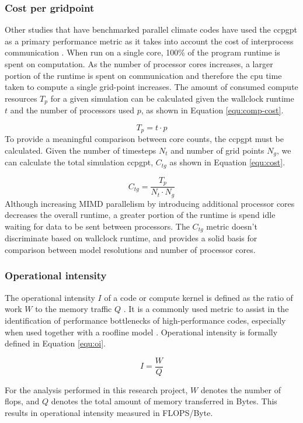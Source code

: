 \documentclass[a4paper,11pt]{report}
\begin{document}
\subsubsection{Cost per gridpoint}
Other studies that have benchmarked parallel climate codes have used the \gls{ccpgpt} as a primary performance metric as it takes into account the cost of interprocess communication \cite{schmidt2007benchmark}. When run on a single core, 100\% of the program runtime is spent on computation. As the number of processor cores increases, a larger portion of the runtime is spent on communication and therefore the cpu time taken to compute a single grid-point increases. The amount of consumed compute resources $T_p$ for a given simulation can be calculated given the wallclock runtime $t$ and the number of processors used $p$, as shown in Equation \ref{equ:comp-cost}.
\par
\begin{equation}
T_p = t \cdot p
\label{equ:comp-cost}
\end{equation}
To provide a meaningful comparison between core counts, the \gls{ccpgpt} must be calculated. Given the number of timesteps $N_t$ and number of grid points $N_g$, we can calculate the total simulation \gls{ccpgpt}, $C_{tg}$ as shown in Equation \ref{equ:cost}. 

\begin{equation}
C_{tg} = \frac{T_p}{N_t \cdot N_g}
\label{equ:cost}
\end{equation}
Although increasing MIMD parallelism by introducing additional processor cores decreases the overall runtime, a greater portion of the runtime is spend idle waiting for data to be sent between processors. The $C_{tg}$ metric doesn't discriminate based on wallclock runtime, and provides a solid basis for comparison between model resolutions and number of processor cores. 

\subsubsection{Operational intensity}
The operational intensity $I$ of a code or compute kernel is defined as the ratio of work $W$ to the memory traffic $Q$ \cite{williams2009roofline}. It is a commonly used metric to assist in the identification of performance bottlenecks of high-performance codes, especially when used together with a roofline model \cite{williams2009roofline}. Operational intensity is formally defined in Equation \ref{equ:oi}.

\begin{equation}
\label{equ:oi}
I = \frac{W}{Q}
\end{equation}
\par
For the analysis performed in this research project, $W$ denotes the number of \gls{flops}, and $Q$ denotes the total amount of memory transferred in Bytes. This results in operational intensity measured in FLOPS/Byte. 
\end{document}
